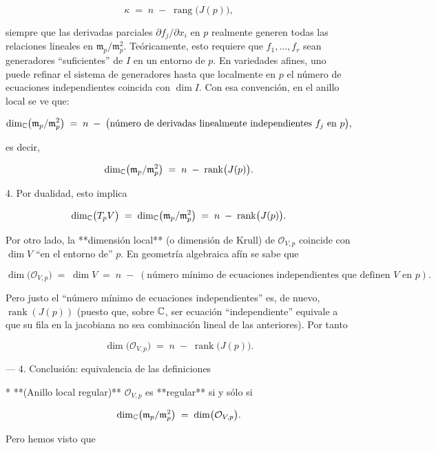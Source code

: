   $$
     \kappa \;=\; n \;-\; \operatorname{rang}\bigl(J(p)\bigr),
   $$

   siempre que las derivadas parciales $\partial f_j/\partial x_i$ en $p$ realmente generen todas las relaciones lineales en $\mathfrak m_p/\mathfrak m_p^2$. Teóricamente, esto requiere que $f_1,\dots,f_r$ sean generadores “suficientes” de $I$ en un entorno de $p$. En variedades afines, uno puede refinar el sistema de generadores hasta que localmente en $p$ el número de ecuaciones independientes coincida con $\dim I $. Con esa convención, en el anillo local se ve que:

   $$
     \dim_{\mathbb{C}}\bigl(\mathfrak m_p / \mathfrak m_p^2\bigr)
     \;=\;
     n \;-\; \bigl(\text{número de derivadas linealmente independientes }f_j\text{ en }p\bigr),
   $$

   es decir,

   $$
     \dim_{\mathbb{C}}\bigl(\mathfrak m_p / \mathfrak m_p^2\bigr)
     \;=\;
     n \;-\; \operatorname{rank}\bigl(J(p)\bigr).
   $$

4. Por dualidad, esto implica

$$
  \dim_{\mathbb{C}}\bigl(T_p V\bigr)
  \;=\;
  \dim_{\mathbb{C}}\bigl(\mathfrak m_p / \mathfrak m_p^2\bigr)
  \;=\;
  n \;-\; \operatorname{rank}\bigl(J(p)\bigr).
$$

Por otro lado, la **dimensión local** (o dimensión de Krull) de $\mathcal O_{V,p}$ coincide con $\dim V$ “en el entorno de” $p$.  En geometría algebraica afín se sabe que

$$
  \dim\bigl(\mathcal O_{V,p}\bigr)
  \;=\;
  \dim V
  \;=\;
  n \;-\; (\text{número mínimo de ecuaciones independientes que definen }V\text{ en }p).
$$

Pero justo el “número mínimo de ecuaciones independientes” es, de nuevo, $\operatorname{rank}(J(p))$ (puesto que, sobre $\mathbb{C}$, ser ecuación “independiente” equivale a que su fila en la jacobiana no sea combinación lineal de las anteriores).  Por tanto

$$
  \dim\bigl(\mathcal O_{V,p}\bigr)
  \;=\;
  n \;-\; \operatorname{rank}\bigl(J(p)\bigr).
$$

---
4. Conclusión: equivalencia de las definiciones

* **(Anillo local regular)**
  $\mathcal O_{V,p}$ es **regular** si y sólo si

  $$
    \dim_{\mathbb{C}}\bigl(\mathfrak m_p / \mathfrak m_p^2\bigr)
    \;=\; 
    \dim\bigl(\mathcal O_{V,p}\bigr).
  $$

  Pero hemos visto que

